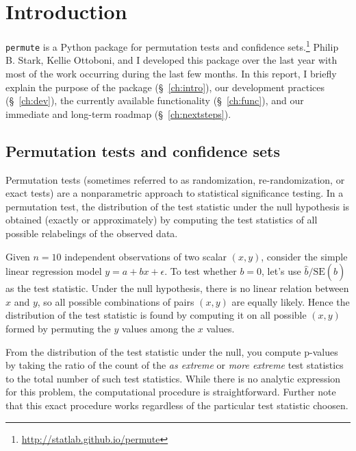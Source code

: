 \chapter{\label{ch:intro}Introduction}

\texttt{permute} is a Python package for permutation tests and confidence
sets.\footnote{\url{http://statlab.github.io/permute}}
Philip B. Stark, Kellie Ottoboni, and I developed this package over the
last year with most of the work occurring during the last few months.
In this report, I briefly explain the purpose of the package (\S~\ref{ch:intro}), our
development practices (\S~\ref{ch:dev}), the currently available functionality (\S~\ref{ch:func}), and
our immediate and long-term roadmap (\S~\ref{ch:nextsteps}).

\section{Permutation tests and confidence sets}

Permutation tests (sometimes referred to as randomization, re-randomization, or
exact tests) are a nonparametric approach to statistical significance
testing.  In a permutation test, the distribution of the test statistic under
the null hypothesis is obtained (exactly or approximately) by 
computing the test statistics of all possible relabelings of the observed data.



Given $n=10$ independent observations of two scalar $(x, y)$, consider
the simple linear regression model $y = a + bx + \epsilon$.  To test 
whether $b = 0$, let's use $\hat{b}/\text{SE}(\hat{b})$ as the test statistic.  Under the null
hypothesis, there is no linear relation between $x$ and $y$, so all possible
combinations of pairs $(x,y)$ are equally likely.  Hence the distribution of
the test statistic is found by computing it on all possible $(x, y)$ formed by
permuting the $y$ values among the $x$ values.

From the distribution of the test statistic under the null, you compute
p-values by taking the ratio of the count of the \emph{as extreme} or
\emph{more extreme} test statistics to the total number of such test
statistics. While there is no analytic expression for this problem, the
computational procedure is straightforward.  Further note that this exact
procedure works regardless of the particular test statistic choosen.

